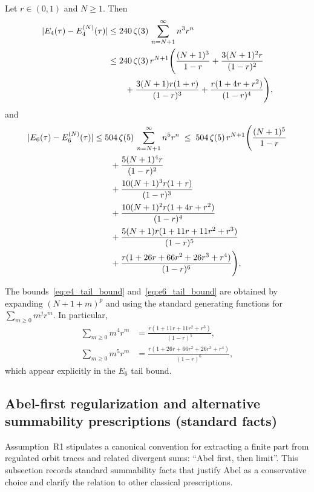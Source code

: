 \begin{proposition}
\label{prop:eisenstein_tail_bounds}
Let $r\in(0,1)$ and $N\ge 1$. Then
\begin{align}
\label{eq:e4_tail_bound}
|E_4(\tau)-E_4^{(N)}(\tau)|
&\le 240\,\zeta(3)\,\sum_{n=N+1}^\infty n^3 r^n
\\
&\le 240\,\zeta(3)\,r^{N+1}\Bigg(
\frac{(N+1)^3}{1-r}
 +\frac{3(N+1)^2 r}{(1-r)^2}
\\
&\qquad +\frac{3(N+1) r(1+r)}{(1-r)^3}
 +\frac{r(1+4r+r^2)}{(1-r)^4}
\Bigg), \notag
\end{align}
and
\begin{align}
\label{eq:e6_tail_bound}
|E_6(\tau)-E_6^{(N)}(\tau)|
&\le 504\,\zeta(5)\,\sum_{n=N+1}^\infty n^5 r^n
\;\le\;
504\,\zeta(5)\,r^{N+1}\Bigg(
\frac{(N+1)^5}{1-r}
\notag\\
&\qquad +\frac{5(N+1)^4 r}{(1-r)^2}
\notag\\
&\qquad +\frac{10(N+1)^3 r(1+r)}{(1-r)^3}
\notag\\
&\qquad +\frac{10(N+1)^2 r(1+4r+r^2)}{(1-r)^4}
\notag\\
&\qquad +\frac{5(N+1) r(1+11r+11r^2+r^3)}{(1-r)^5}
\notag\\
&\qquad +\frac{r(1+26r+66r^2+26r^3+r^4)}{(1-r)^6}
\Bigg),
\end{align}
\end{proposition}

\begin{remark}
The bounds~\eqref{eq:e4_tail_bound} and~\eqref{eq:e6_tail_bound} are obtained by expanding $(N+1+m)^p$ and using the standard generating functions for $\sum_{m\ge 0} m^j r^m$. In particular,
\begin{align}
\sum_{m\ge 0} m^4 r^m &= \frac{r(1+11r+11r^2+r^3)}{(1-r)^5},\\
\sum_{m\ge 0} m^5 r^m &= \frac{r(1+26r+66r^2+26r^3+r^4)}{(1-r)^6},
\end{align}
which appear explicitly in the $E_6$ tail bound.
\end{remark}

\subsection{Abel-first regularization and alternative summability prescriptions (standard facts)}
\label{app:abel_regularization_summability}

Assumption~R1 stipulates a canonical convention for extracting a finite part from regulated orbit traces and related divergent sums: ``Abel first, then limit''.
This subsection records standard summability facts that justify Abel as a conservative choice and clarify the relation to other classical prescriptions.
\par
